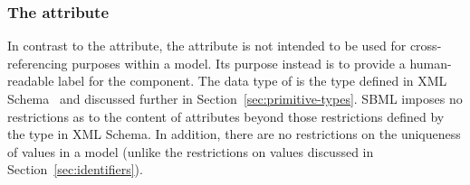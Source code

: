 \subsubsection{The  attribute}
\label{sec:name}

In contrast to the  attribute, the  attribute
is not intended to be used for cross-referencing
purposes within a model.  Its purpose instead is to provide a
human-readable label for the component.  The data type of 
 is the type  defined in XML
Schema~\citep{biron:2000,thompson:2000} and discussed further in
Section~\ref{sec:primitive-types}.  SBML imposes no restrictions
as to the content of  attributes beyond those restrictions
defined by the  type in XML Schema.
In addition, there are no restrictions on the uniqueness
of  values in a model (unlike the restrictions on
 values discussed in Section~\ref{sec:identifiers}).


